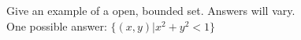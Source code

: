 {Give an example of a open, bounded set.}
{Answers will vary.\\
One possible answer: $\{(x,y) | x^2+y^2<1 \}$}
